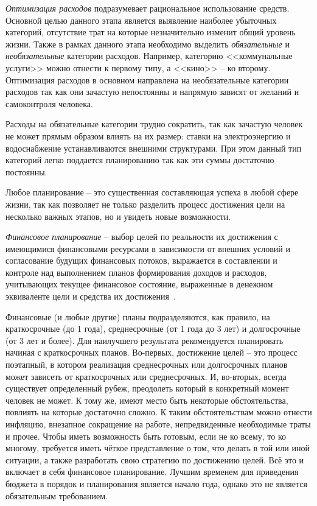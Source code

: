\emph{Оптимизация расходов} подразумевает рациональное использование средств.
Основной целью данного этапа является выявление наиболее убыточных категорий, отсутствие трат на которые незначительно изменит общий уровень жизни. Также в рамках данного этапа необходимо выделить \emph{обязательные} и \emph{необязательные} категории расходов.
Например, категорию <<коммунальные услуги>>  можно отнести к первому типу, а <<кино>> -- ко второму.
Оптимизация расходов в основном направлена на необязательные категории расходов так как они зачастую непостоянны и напрямую зависят от желаний и самоконтроля человека.

Расходы на обязательные категории трудно сократить, так как зачастую человек не может прямым образом влиять на их размер: ставки на электроэнергию и водоснабжение устанавливаются внешними структурами.
При этом данный тип категорий легко поддается планированию так как эти суммы достаточно постоянны.

Любое планирование -- это существенная составляющая успеха в любой сфере жизни,  так как позволяет не только разделить процесс достижения цели на несколько важных этапов, но и увидеть новые возможности.

\emph{Финансовое планирование} -- выбор целей по реальности их достижения с имеющимися финансовыми ресурсами в зависимости от внешних условий и согласование будущих финансовых потоков, выражается в составлении и контроле над выполнением планов формирования доходов и расходов, учитывающих текущее финансовое состояние, выраженные в денежном эквиваленте цели и средства их достижения~\cite{finance_planning}.

Финансовые (и любые другие) планы подразделяются, как правило, на краткосрочные (до 1 года), среднесрочные (от 1 года до 3 лет) и долгосрочные (от 3 лет и более).
Для наилучшего результата рекомендуется планировать начиная с краткосрочных планов.
Во-первых, достижение целей -- это процесс поэтапный, в котором реализация среднесрочных или долгосрочных планов может зависеть от краткосрочных или среднесрочных.
И, во-вторых, всегда существует определенный рубеж, преодолеть который в конкретный момент человек не может.
К тому же, имеют место быть некоторые обстоятельства, повлиять на которые достаточно сложно.
К таким обстоятельствам можно отнести инфляцию, внезапное сокращение на работе, непредвиденные необходимые траты и прочее.
Чтобы иметь возможность быть готовым, если не ко всему, то ко многому, требуется иметь чёткое представление о том, что делать в той или иной ситуации, а также разработать свою стратегию по достижению целей.
Всё это и включает в себя финансовое планирование.
Лучшим временем для приведения бюджета в порядок и планирования является начало года, однако это не является обязательным требованием.


